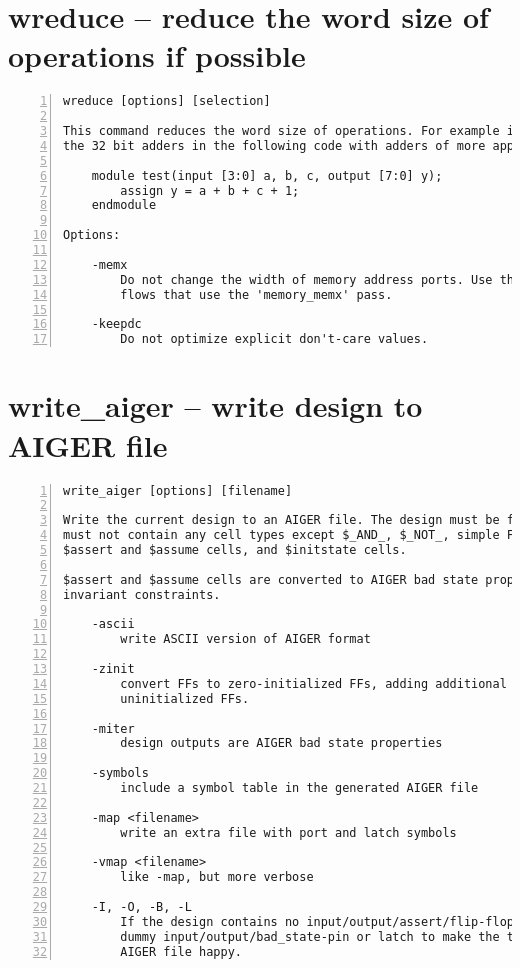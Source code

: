 \section{wreduce -- reduce the word size of operations if possible}
\label{cmd:wreduce}
\begin{lstlisting}[numbers=left,frame=single]
    wreduce [options] [selection]

This command reduces the word size of operations. For example it will replace
the 32 bit adders in the following code with adders of more appropriate widths:

    module test(input [3:0] a, b, c, output [7:0] y);
        assign y = a + b + c + 1;
    endmodule

Options:

    -memx
        Do not change the width of memory address ports. Use this options in
        flows that use the 'memory_memx' pass.

    -keepdc
        Do not optimize explicit don't-care values.
\end{lstlisting}

\section{write\_aiger -- write design to AIGER file}
\label{cmd:write_aiger}
\begin{lstlisting}[numbers=left,frame=single]
    write_aiger [options] [filename]

Write the current design to an AIGER file. The design must be flattened and
must not contain any cell types except $_AND_, $_NOT_, simple FF types,
$assert and $assume cells, and $initstate cells.

$assert and $assume cells are converted to AIGER bad state properties and
invariant constraints.

    -ascii
        write ASCII version of AIGER format

    -zinit
        convert FFs to zero-initialized FFs, adding additional inputs for
        uninitialized FFs.

    -miter
        design outputs are AIGER bad state properties

    -symbols
        include a symbol table in the generated AIGER file

    -map <filename>
        write an extra file with port and latch symbols

    -vmap <filename>
        like -map, but more verbose

    -I, -O, -B, -L
        If the design contains no input/output/assert/flip-flop then create one
        dummy input/output/bad_state-pin or latch to make the tools reading the
        AIGER file happy.
\end{lstlisting}


